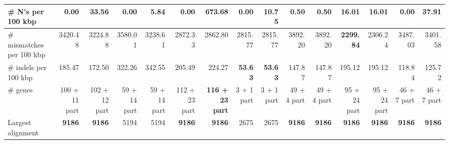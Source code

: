 \documentclass[12pt,a4paper]{article}
\begin{document}
\begin{table}[ht]
\begin{center}
\begin{tabular}{|l*{14}{|r}|}
\# N's per 100 kbp & {\bf 0.00} & 33.56 & {\bf 0.00} & 5.84 & {\bf 0.00} & 673.68 & {\bf 0.00} & 10.75 & 0.50 & 0.50 & 16.01 & 16.01 & {\bf 0.00} & 37.91 \\ \hline
\# mismatches per 100 kbp & 3420.48 & 3224.88 & 3580.01 & 3238.61 & 2872.33 & 2862.80 & 2815.77 & 2815.77 & 3892.20 & 3892.20 & {\bf 2299.84} & 2306.24 & 3487.03 & 3401.58 \\ \hline
\# indels per 100 kbp & 185.47 & 172.50 & 322.26 & 342.55 & 205.49 & 224.27 & {\bf 53.63} & {\bf 53.63} & 147.87 & 147.87 & 195.12 & 195.12 & 118.84 & 125.72 \\ \hline
\# genes & 100 + 11 part & 102 + 12 part & 59 + 14 part & 59 + 14 part & 112 + 23 part & {\bf 116 + 23 part} & 3 + 1 part & 3 + 1 part & 49 + 4 part & 49 + 4 part & 95 + 24 part & 95 + 24 part & 46 + 7 part & 46 + 7 part \\ \hline
Largest alignment & {\bf 9186} & {\bf 9186} & 5194 & 5194 & {\bf 9186} & {\bf 9186} & 2675 & 2675 & {\bf 9186} & {\bf 9186} & {\bf 9186} & {\bf 9186} & {\bf 9186} & {\bf 9186} \\ \hline
\end{tabular}
\end{center}
\end{table}
\end{document}
